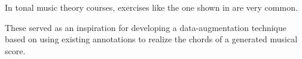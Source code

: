 
In tonal music theory courses, exercises like the one shown
in  are very common.


These served as an inspiration for developing a
data-augmentation technique based on using existing
annotations to \gls{realize} the chords of a generated
musical score.